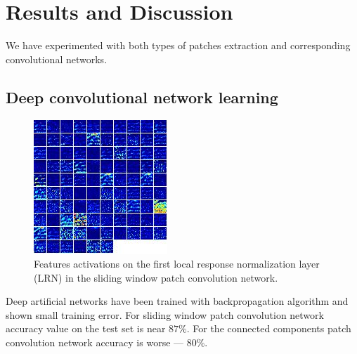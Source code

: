 \documentclass[a4paper,conference]{IEEEtran}
\begin{document}

\section{Results and Discussion}
\label{sec:results_and_description}

We have experimented with both types of patches extraction and corresponding convolutional networks. 

\subsection{Deep convolutional network learning}


\begin{figure}[!b]
	\centering
  	\includegraphics[width=0.75\linewidth]{figures/norm1.png}
	\caption{Features activations on the first local response normalization layer (LRN) in the sliding window patch convolution network.}
  	\label{fig:lrn_activation}
\end{figure}

Deep artificial networks have been trained with backpropagation algorithm \cite{CNN} and shown small training error. For sliding window patch convolution network accuracy value on the test set is near $87 \%$. For the connected components patch convolution network accuracy is worse --- $80 \%$. 
\end{document}
